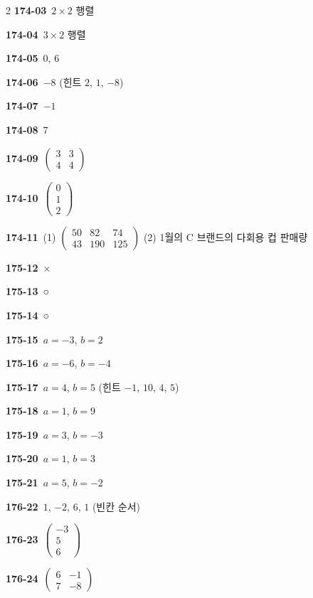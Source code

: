 \documentclass[10pt,a4paper]{article}
\begin{document}
\begin{multicols}{2}
\noindent\textbf{174-03}\ $2\times 2$ 행렬\par
\noindent\textbf{174-04}\ $3\times 2$ 행렬\par
\noindent\textbf{174-05}\ 0, 6\par
\noindent\textbf{174-06}\ $-8$ (힌트 $2$, $1$, $-8$)\par
\noindent\textbf{174-07}\ $-1$\par
\noindent\textbf{174-08}\ 7\par
\noindent\textbf{174-09}\ $\begin{pmatrix} 3 & 3 \\ 4 & 4 \end{pmatrix}$\par
\noindent\textbf{174-10}\ $\begin{pmatrix} 0 \\ 1 \\ 2 \end{pmatrix}$\par
\noindent\textbf{174-11}\ (1) $\begin{pmatrix} 50 & 82 & 74 \\ 43 & 190 & 125 \end{pmatrix}$ (2) 1월의 C 브랜드의 다회용 컵 판매량\par
\noindent\textbf{175-12}\ ×\par
\noindent\textbf{175-13}\ ○\par
\noindent\textbf{175-14}\ ○\par
\noindent\textbf{175-15}\ $a=-3$, $b=2$\par
\noindent\textbf{175-16}\ $a=-6$, $b=-4$\par
\noindent\textbf{175-17}\ $a=4$, $b=5$ (힌트 $-1$, $10$, $4$, $5$)\par
\noindent\textbf{175-18}\ $a=1$, $b=9$\par
\noindent\textbf{175-19}\ $a=3$, $b=-3$\par
\noindent\textbf{175-20}\ $a=1$, $b=3$\par
\noindent\textbf{175-21}\ $a=5$, $b=-2$\par
\noindent\textbf{176-22}\ $1$, $-2$, $6$, $1$ (빈칸 순서)\par
\noindent\textbf{176-23}\ $\begin{pmatrix} -3 \\ 5 \\ 6 \end{pmatrix}$\par
\noindent\textbf{176-24}\ $\begin{pmatrix} 6 & -1 \\ 7 & -8 \end{pmatrix}$\par

\end{multicols}
\end{document}
